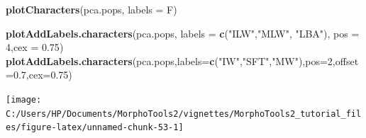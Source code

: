 \documentclass[
]{article}
\newenvironment{Shaded}{\begin{snugshade}}{\end{snugshade}}
\newcommand{\DataTypeTok}[1]{\textcolor[rgb]{0.13,0.29,0.53}{#1}}
\newcommand{\DecValTok}[1]{\textcolor[rgb]{0.00,0.00,0.81}{#1}}
\newcommand{\FloatTok}[1]{\textcolor[rgb]{0.00,0.00,0.81}{#1}}
\newcommand{\KeywordTok}[1]{\textcolor[rgb]{0.13,0.29,0.53}{\textbf{#1}}}
\newcommand{\NormalTok}[1]{#1}
\newcommand{\StringTok}[1]{\textcolor[rgb]{0.31,0.60,0.02}{#1}}
\begin{document}
\begin{Shaded}
\begin{Highlighting}[]
\KeywordTok{plotCharacters}\NormalTok{(pca.pops, }\DataTypeTok{labels =}\NormalTok{ F)}

\KeywordTok{plotAddLabels.characters}\NormalTok{(pca.pops, }\DataTypeTok{labels =} \KeywordTok{c}\NormalTok{(}\StringTok{"ILW"}\NormalTok{,}\StringTok{"MLW"}\NormalTok{, }\StringTok{"LBA"}\NormalTok{), }\DataTypeTok{pos =} \DecValTok{4}\NormalTok{,}\DataTypeTok{cex =} \FloatTok{0.75}\NormalTok{)}
\KeywordTok{plotAddLabels.characters}\NormalTok{(pca.pops,}\DataTypeTok{labels=}\KeywordTok{c}\NormalTok{(}\StringTok{"IW"}\NormalTok{,}\StringTok{"SFT"}\NormalTok{,}\StringTok{"MW"}\NormalTok{),}\DataTypeTok{pos=}\DecValTok{2}\NormalTok{,}\DataTypeTok{offset=}\FloatTok{0.7}\NormalTok{,}\DataTypeTok{cex=}\FloatTok{0.75}\NormalTok{)}
\end{Highlighting}
\end{Shaded}

\begin{center}\texttt{[image: C:/Users/HP/Documents/MorphoTools2/vignettes/MorphoTools2\_tutorial\_files/figure-latex/unnamed-chunk-53-1]} \end{center}
\end{document}
